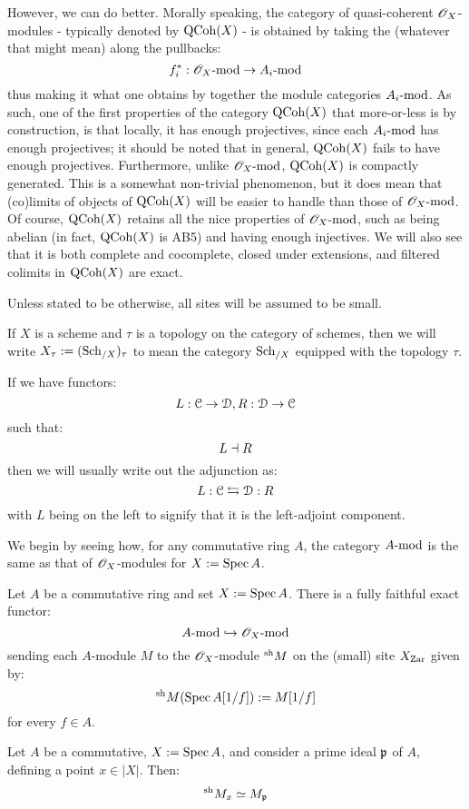             However, we can do better. Morally speaking, the category of quasi-coherent $\scrO_X$-modules - typically denoted by $\QCoh(X)$ - is obtained by taking the  (whatever that might mean) along the pullbacks:
                $$f^*_i: \scrO_X\mod \to A_i\mod$$
            thus making it what one obtains by  together the module categories $A_i\mod$. As such, one of the first properties of the category $\QCoh(X)$ that more-or-less is by construction, is that locally, it has enough projectives, since each $A_i\mod$ has enough projectives; it should be noted that in general, $\QCoh(X)$ fails to have enough  projectives. Furthermore, unlike $\scrO_X\mod$, $\QCoh(X)$ is compactly generated. This is a somewhat non-trivial phenomenon, but it does mean that (co)limits of objects of $\QCoh(X)$ will be easier to handle than those of $\scrO_X\mod$. Of course, $\QCoh(X)$ retains all the nice properties of $\scrO_X\mod$, such as being abelian (in fact, $\QCoh(X)$ is AB5) and having enough injectives. We will also see that it is both complete and cocomplete, closed under extensions, and filtered colimits in $\QCoh(X)$ are exact.

            \begin{convention}
                Unless stated to be otherwise, all sites will be assumed to be small. 

                If $X$ is a scheme and $\tau$ is a topology on the category of schemes, then we will write $X_{\tau} := (\Sch_{/X})_{\tau}$ to mean the category $\Sch_{/X}$ equipped with the topology $\tau$. 

                If we have functors:
                    $$L: \C \to \D, R: \D \to \C$$
                such that:
                    $$L \ladjoint R$$
                then we will usually write out the adjunction as:
                    $$L: \C \leftrightarrows \D: R$$
                with $L$ being on the left to signify that it is the left-adjoint component. 
            \end{convention}

            We begin by seeing how, for any commutative ring $A$, the category $A\mod$ is the same as that of $\scrO_X$-modules for $X := \Spec A$. 
            \begin{lemma} \label{lemma: sheafifying_modules}
                Let $A$ be a commutative ring and set $X := \Spec A$. There is a fully faithful exact functor:
                    $$A\mod \hookrightarrow \scrO_X\mod$$
                sending each $A$-module $M$ to the $\scrO_X$-module ${}^{\sh}M$ on the (small) site $X_{\Zar}$ given by:
                    $${}^{\sh}M(\Spec A[1/f]) := M[1/f]$$
                for every $f \in A$. 
            \end{lemma}
            \begin{corollary}
                Let $A$ be a commutative, $X := \Spec A$, and consider a prime ideal $\p$ of $A$, defining a point $x \in |X|$. Then:
                    $${}^{\sh}M_x \cong M_{\p}$$
            \end{corollary}
            
